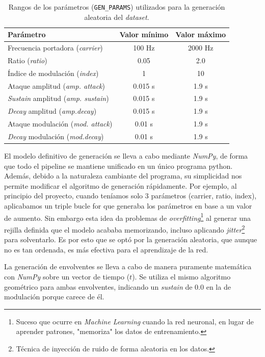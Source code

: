 \begin{table}[H]
    \centering
    \begin{tabular}{lcc}
        \toprule
        \textbf{Parámetro} & \textbf{Valor mínimo} & \textbf{Valor máximo} \\
        \midrule
        Frecuencia portadora (\textit{carrier}) & 100 Hz & 2000 Hz \\
        Ratio (\textit{ratio}) & 0.05 & 2.0 \\
        Índice de modulación (\textit{index}) & 1 & 10 \\
        Ataque amplitud (\textit{amp. attack}) & 0.015 s & 1.9 s \\
        \textit{Sustain} amplitud (\textit{amp. sustain}) & 0.015 s & 1.9 s \\
        \textit{Decay} amplitud (\textit{amp.decay}) & 0.015 s & 1.9 s \\
        Ataque modulación (\textit{mod. attack}) & 0.01 s & 1.9 s \\
        \textit{Decay} modulación (\textit{mod.decay}) & 0.01 s & 1.9 s \\
        \bottomrule
    \end{tabular}
    \caption{Rangos de los parámetros (\texttt{GEN\_PARAMS}) utilizados para la generación aleatoria del \textit{dataset}.}
    \label{tab:gen_params}
\end{table}
El modelo definitivo de generación se lleva a cabo mediante \textit{NumPy}, de forma que todo el pipeline se
mantiene unificado en un único programa python. Además, debido a la naturaleza cambiante del programa, su simplicidad nos
permite modificar el algoritmo de generación rápidamente. Por ejemplo, al principio del proyecto, cuando teníamos solo 3
parámetros (carrier, ratio, index), aplicabamos un triple bucle for que generaba los parámetros en base a un valor de 
aumento. Sin embargo esta idea da problemas de \textit{overfitting}\footnote{Suceso que ocurre en \textit{Machine Learning} cuando la red neuronal, en lugar de aprender patrones, "memoriza" los datos de entrenamiento.} al generar una
rejilla definida que el modelo acababa memorizando, incluso aplicando \textit{jitter}\footnote{Técnica de inyección de ruido de forma aleatoria en los datos.} para solventarlo. Es por esto que se optó por la generación aleatoria, que aunque no es tan ordenada, es más efectiva para el aprendizaje de la red.

La generación de envolventes se lleva a cabo de manera puramente matemática con \textit{NumPy} sobre un vector de tiempo ($t$). Se utiliza el mismo algoritmo geométrico para ambas envolventes, indicando un \textit{sustain} de 0.0 en la de modulación porque carece de él. 

